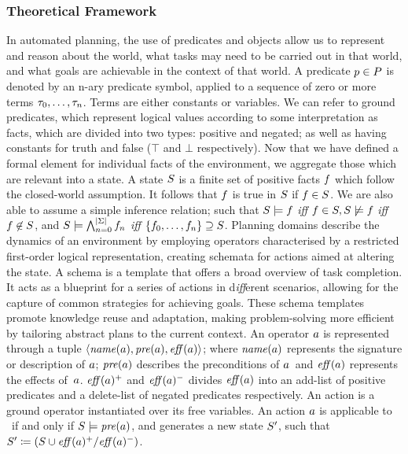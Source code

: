 \subsubsection{Theoretical Framework} 
In automated planning, the use of predicates and objects allow us to represent and reason about the world, what tasks may need to be carried out in that world, and what goals are achievable in the context of that world.
A predicate $p\in P$ is denoted by an n-ary predicate symbol, applied to a sequence of zero or more terms $\tau_0,\dots,\tau_n$. Terms are either constants or variables. We can refer to ground predicates, which represent logical values according to some interpretation as facts, which are divided into two types: positive and negated; as well as having constants for truth and false ($\top$ and $\bot$ respectively).
Now that we have defined a formal element for individual facts of the environment, we aggregate those which are relevant into a state.
A state $S$ is a finite set of positive facts $f$ which follow the closed-world assumption. It follows that $f$ is true in $S$ if $f\in S$. We are also able to assume a simple inference relation; such that $S\models f$ \textit{iff} $f\in S,S\not\models f$ \textit{iff} $f\not\in S$, and $S\models\bigwedge^{\left\lvert \Sigma \right\rvert}_{n=0}f_n$ \textit{iff} $\left\{f_0,\dots,f_n\right\}\supseteq S$.
Planning domains describe the dynamics of an environment by employing operators characterised by a restricted first-order logical representation, creating schemata for actions aimed at altering the state. A schema is a template that offers a broad overview of task completion. It acts as a blueprint for a series of actions in d\textit{iff}erent scenarios, allowing for the capture of common strategies for achieving goals. These schema templates promote knowledge reuse and adaptation, making problem-solving more efficient by tailoring abstract plans to the current context.
An operator $a$ is represented through a tuple $\left\langle\mathit{name}(a),\mathit{pre}(a),\mathit{eff}(a)\right\rangle$; where $\mathit{name}(a)$ represents the signature or description of $a$; $\mathit{pre}(a)$ describes the preconditions of $a$~and $\mathit{eff}(a)$ represents the effects of~$a$. $\mathit{eff}(a)^+$ and $\mathit{eff}(a)^-$ divides $\mathit{eff}(a)$ into an add-list of positive predicates and a delete-list of negated predicates respectively. An action is a ground operator instantiated over its free variables. 
An action $a$ is applicable to \states~if and only if $S\models\mathit{pre}(a)$, and generates a new state $S'$, such that $S'\coloneqq(S\cup\mathit{eff}(a)^+/\mathit{eff}(a)^-)$. 
